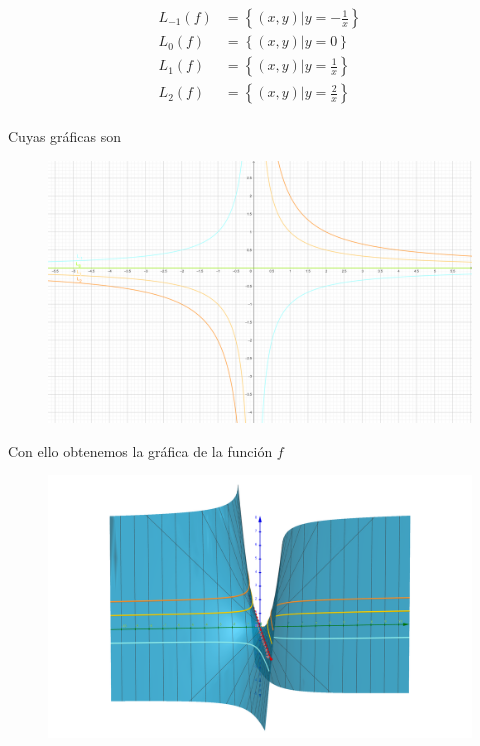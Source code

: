 \documentclass[letterpaper]{article}
\theoremstyle{definition}
\theoremstyle{lemathm}
\theoremstyle{lemathm}
\theoremstyle{lemathm}
\theoremstyle{lemademthm}
\newcommand{\set}[1]{\left \{ #1 \right\} }
\newcommand{\1}{\mathbbm{1}}
\begin{document}
\begin{enumerate}
\begin{enumerate}
			\begin{align*}
				L_{-1}(f) &= \set{(x,y) | y = -\frac{1}{x}}\\
				L_{0}(f) &= \set{(x,y) | y = 0}\\
				L_{1}(f) &= \set{(x,y) | y = \frac{1}{x}}\\
				L_{2}(f) &= \set{(x,y) | y = \frac{2}{x}}\\
			\end{align*}

			Cuyas gráficas son

			\begin{figure}[h!]
				\includegraphics[scale=0.9]{Images/10.2.1.png}
				\centering
			\end{figure}

			Con ello obtenemos la gráfica de la función $f$

			\begin{figure}[h!]
				\includegraphics[scale=0.1]{Images/10.2.2.png}
				\centering
			\end{figure}


\end{enumerate}
\end{enumerate}
\end{document}
